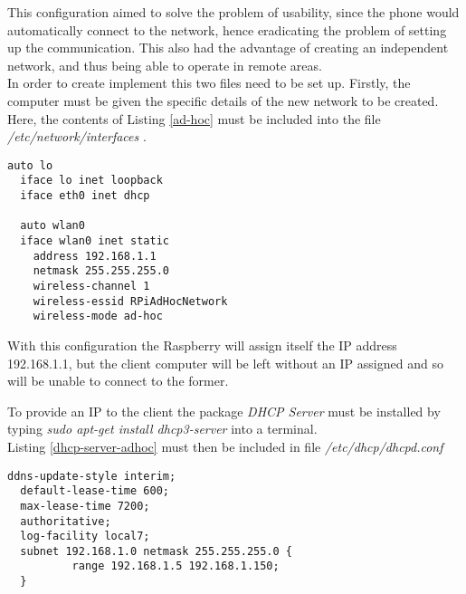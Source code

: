 This configuration aimed to solve the problem of usability, since the phone would automatically connect to the network, hence eradicating the problem of setting up the communication.  This also had the advantage of creating an independent network, and thus being able to operate in remote areas. \\

In order to create implement this two files need to be set up. Firstly, the computer must be given the specific details of the new network to be created. Here, the contents of Listing \ref{ad-hoc} must be included into the file \textit{/etc/network/interfaces} . \\

	\begin{minipage}{\linewidth}%
	\begin{lstlisting}[label=ad-hoc,caption=Ad-Hoc Configuration {[} /etc/network/interfaces {]}  ]
  auto lo
  iface lo inet loopback
  iface eth0 inet dhcp
 
  auto wlan0
  iface wlan0 inet static
    address 192.168.1.1
    netmask 255.255.255.0
    wireless-channel 1
    wireless-essid RPiAdHocNetwork
    wireless-mode ad-hoc
	\end{lstlisting}
	\end{minipage}

\bigskip
With this configuration the Raspberry will assign itself the IP address 192.168.1.1, but the client computer will be left without an IP assigned and so will be unable to connect to the former. 

To provide an IP to the client the package \textit{DHCP Server} must be installed by typing \textit{sudo apt-get install dhcp3-server} into a terminal. \\

Listing \ref{dhcp-server-adhoc} must then be included in file \textit{/etc/dhcp/dhcpd.conf} \\

	\begin{minipage}{\linewidth}%
	\begin{lstlisting}[label=dhcp-server-adhoc,caption=DHCP Server Configuration {[} /etc/dhcp/dhcpd.conf {]}  ]
  ddns-update-style interim;
  default-lease-time 600;
  max-lease-time 7200;
  authoritative;
  log-facility local7;
  subnet 192.168.1.0 netmask 255.255.255.0 {
		  range 192.168.1.5 192.168.1.150;
  }
	\end{lstlisting}
	\end{minipage}

